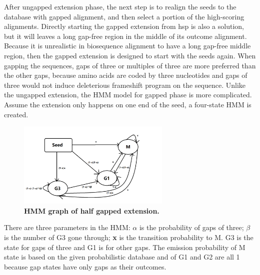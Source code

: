 \documentclass[12pt]{article}
\begin{document}
After ungapped extension phase, the next step is to realign the seeds to the database with gapped alignment, and then select a portion of the high-scoring alignments. Directly starting the gapped extension from hsp is also a solution, but it will leaves a long gap-free region in the middle of its outcome alignment. Because it is unrealistic in biosequence alignment to have a long gap-free middle region, then the gapped extension is designed to start with the seeds again. When gapping the sequences, gaps of three or multiples of three are more preferred than the other gaps, because amino acids are coded by three nucleotides and gaps of three would not induce deleterious frameshift program on the sequence. Unlike the ungapped extension, the HMM model for gapped phase is more complicated. Assume the extension only happens on one end of the seed, a four-state HMM is created.
	
    \begin{figure}[!htb]
            \centering
		\includegraphics[width=0.65\textwidth,trim={0.5cm 1cm 2cm 0.5cm},clip]{fig4} %
		\caption{\textbf{HMM graph of half gapped extension.}}
		\label{fig:halfGappedHMMGraph}
	\end{figure}

There are three parameters in the HMM: \textbf{$\alpha$} is the probability of gaps of three; \textbf{$\beta$} is the number of G3 gone through; \textbf{x} is the transition probability to M. G3 is the state for gaps of three and G1 is for other gaps. The emission probability of M state is based on the given probabilistic database and of G1 and G2 are all 1 because gap states have only gaps as their outcomes.
    
\end{document}
